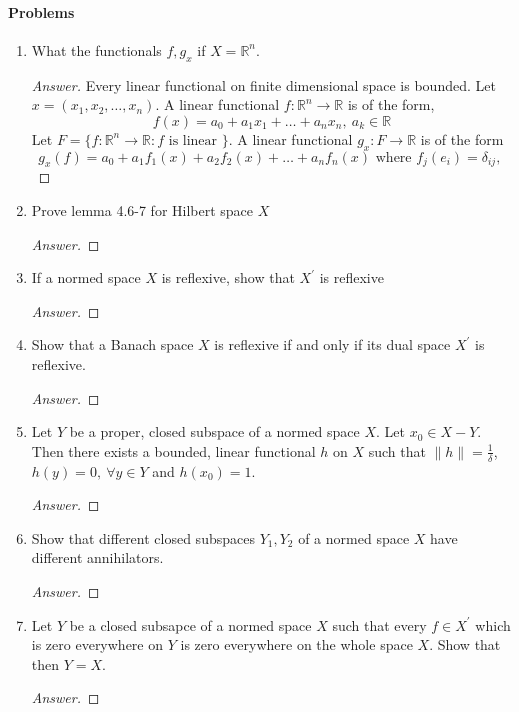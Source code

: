 \paragraph{Problems}
\begin{enumerate}
	\item What the functionals $f,g_x$ if $X = \mathbb{R}^n$.
		\begin{proof}[Answer]
			Every linear functional on finite dimensional space is bounded.
			Let $x = (x_1,x_2,\dots,x_n)$.
			A linear functional $f : \mathbb{R}^n \to \mathbb{R}$ is of the form,
			\[ f(x) = a_0+a_1x_1+\dots+a_nx_n,\ a_k \in \mathbb{R} \]
			Let $F = \{ f : \mathbb{R}^n \to \mathbb{R} : f \text{ is linear } \}$.
			A linear functional $g_x : F \to \mathbb{R}$ is of the form
			\[ g_x(f) = a_0 + a_1f_1(x)+a_2f_2(x)+\dots+a_nf_n(x) \text{ where } f_j(e_i) = \delta_{ij},\  \]
		\end{proof}
	\item Prove lemma 4.6-7 for Hilbert space $X$
		\begin{proof}[Answer]
		\end{proof}
	\item If a normed space $X$ is reflexive, show that $X^\prime$ is reflexive
		\begin{proof}[Answer]
		\end{proof}
	\item Show that a Banach space $X$ is reflexive if and only if its dual space $X^\prime$ is reflexive.
		\begin{proof}[Answer]
		\end{proof}
	\item Let $Y$ be a proper, closed subspace of a normed space $X$.
		Let $x_0 \in X-Y$.
		Then there exists a bounded, linear functional $h$ on $X$ such that $\|h\| = \frac{1}{\delta}$, $h(y) = 0,\ \forall y \in Y$ and $h(x_0) = 1$.
		\begin{proof}[Answer]
		\end{proof}
	\item Show that different closed subspaces $Y_1,Y_2$ of a normed space $X$ have different annihilators.
		\begin{proof}[Answer]
		\end{proof}
	\item Let $Y$ be a closed subsapce of a normed space $X$ such that every $f \in X^\prime$ which is zero everywhere on $Y$ is zero everywhere on the whole space $X$.
		Show that then $Y = X$.
		\begin{proof}[Answer]
		\end{proof}

\end{enumerate}
